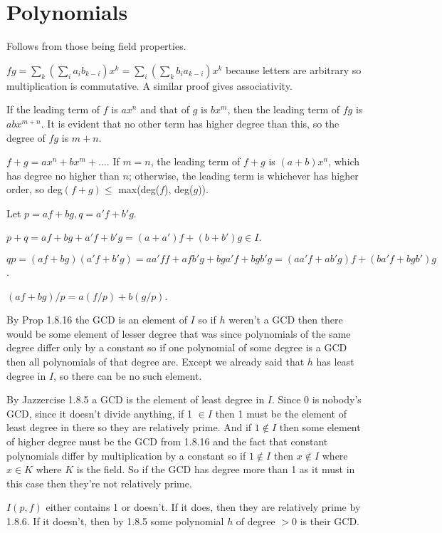 \documentclass[11pt, oneside]{article}   	%
\begin{document}
\section{Polynomials}

\be
\item Follows from those being field properties.
\item $fg = \sum_k (\sum_i a_ib_{k-i})x^k = \sum_i (\sum_k b_i a_{k-i})x^k$ because letters are arbitrary so multiplication is commutative. A similar proof gives associativity.
\item \be
\item If the leading term of $f$ is $ax^n$ and that of $g$ is $bx^m$, then the leading term of $fg$ is $abx^{m+n}$. It is evident that no other term has higher degree than this, so the degree of $fg $ is $m + n$.
\item $f + g = ax^n + bx^m + \ldots$. If $m = n$, the leading term of $f + g$ is $(a + b)x^n$, which has degree no higher than $n$; otherwise, the leading term is whichever has higher order,  so deg$(f + g) \le $ max(deg($f$), deg($g$)).
\ee
\item Let $p = af + bg, q = a'f + b'g$. \be
\item $p + q = af + bg + a'f + b'g = (a + a')f + (b + b')g \in I$.
\item $qp = (af + bg)(a'f + b'g) = aa'ff + afb'g + bga'f + bgb'g = (aa'f + ab'g) f + (ba'f + bgb')g$.
\item $(af + bg) / p = a(f/p) + b(g/p)$. 
\ee
\item By Prop 1.8.16 the GCD is an element of $I$ so if $h$ weren't a GCD then there would be some element of lesser degree that was since polynomials of the same degree differ only by a constant so if one polynomial of some degree is a GCD then all polynomials of that degree are. Except we already said that $h$ has least degree in $I$, so there can be no such element.
\item By Jazzercise 1.8.5 a GCD is the element of least degree in $I$. Since 0 is nobody's GCD, since it doesn't divide anything, if 1 $\in I$ then 1 must be the element of least degree in there so they are relatively prime. And if $1 \not \in I$ then some element of higher degree must be the GCD from 1.8.16 and the fact that constant polynomials differ by multiplication by a constant so if $1 \not \in I$ then $x \not \in I$ where $x \in K$ where $K$ is the field. So if the GCD has degree more than 1 as it must in this case then they're not relatively prime.
\item $I(p, f)$ either contains 1 or doesn't. If it does, then they are relatively prime by 1.8.6. If it doesn't, then by 1.8.5 some polynomial $h$ of degree $> 0$ is their GCD. 
\end{document}
